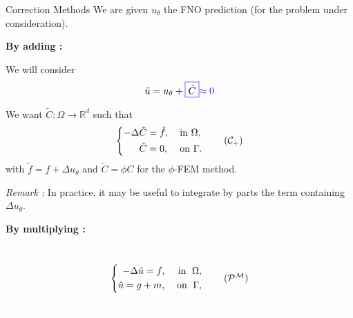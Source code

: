 
\begin{frame}{Correction Methods}
    We are given $u_\theta$ the FNO prediction (for the problem under consideration).
    
    \begin{minipage}{0.48\linewidth}
        \textbf{By adding :}
    
        We will consider
        \begin{equation*}
            \tilde{u}=u_\theta+\fcolorbox{blue}{white}{$\tilde{C}$}\textcolor{blue}{\approx 0}
        \end{equation*}

        We want $\tilde{C}: \Omega \rightarrow \mathbb{R}^d$ such that
        \begin{equation}
            \left\{\begin{aligned}
                -\Delta \tilde{C}&=\tilde{f}, \; &&\text{in } \Omega, \\
                \tilde{C}&=0, \; &&\text{on } \Gamma.
            \end{aligned}\right. \tag{$\mathcal{C}_{+}$} %
        \end{equation}
        with $\tilde{f}=f+\Delta u_\theta$ and $\tilde{C}=\phi C$ for the $\phi$-FEM method.
        
        \small
        \textit{Remark :} In practice, it may be useful to integrate by parts the term containing $\Delta u_\theta$.
    \end{minipage} \quad
    \begin{minipage}{0.48\linewidth}
        \textbf{By multiplying :}
        
        \small
        \textcolor{white}{Find $\hat{u} : \Omega \rightarrow \mathbb{R}^d$ such that
		\begin{equation}
			\left\{
			\begin{aligned}
				-\Delta \hat{u} = f, \; &&\text{in } \; \Omega, \\
				\hat{u}=g+m, \; &&\text{on } \; \Gamma,
			\end{aligned}
			\right. \tag{$\mathcal{P}^\mathcal{M}$} %
		\end{equation}
		with $\hat{u}=u+m$ ($m$ a constant).}


\end{minipage}
\end{frame}
